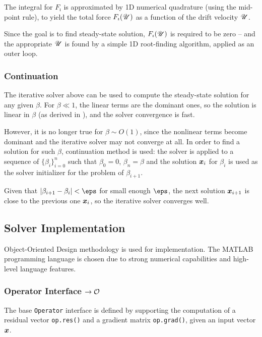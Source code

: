 The integral for $F_\imath$ is approximated by 1D numerical quadrature
(using the mid-point rule), to yield 
the total force $F_\imath(\mathscr{U})$ as a function of the drift velocity $\mathscr{U}$.

Since the goal is to find steady-state solution, $F_\imath(\mathscr{U})$ 
is required to be zero --
and the appropriate $\mathscr{U}$ is found by a simple 1D root-finding algorithm,
applied as an outer loop.

\subsubsection{Continuation}

The iterative solver above can be used to compute the steady-state solution for any given $\beta$.
For $\beta \ll 1$, the linear terms are the dominant ones, so the solution is linear in $\beta$ 
(as derived in \cite{yariv2010migration}), and the solver convergence is fast.

However, it is no longer true for $\beta \sim O(1)$, since the nonlinear terms become dominant
and the iterative solver may not converge at all.
In order to find a solution for such $\beta$, continuation method is used:
the solver is applied to a sequence of $\{\beta_i\}_{i=0}^n$ such that $\beta_0 = 0$,
$\beta_n = \beta$ and the solution $\boldsymbol{x}_i$ for $\beta_i$ is used as the solver initializer
for the problem of $\beta_{i+1}$.

Given that $|\beta_{i+1} - \beta_i| < \eps$ for small enough $\eps$, 
the next solution $\boldsymbol{x}_{i+1}$ is close to the previous one $\boldsymbol{x}_i$,
so the iterative solver converges well.

\subsection{Solver Implementation}

Object-Oriented Design methodology is used for implementation.
The MATLAB programming language is chosen due to strong numerical capabilities
and high-level language features.

\subsubsection{Operator Interface $ \rightarrow \mathcal{O}$}
The base \verb|Operator| interface is defined by 
supporting the computation of a residual vector \verb|op.res()|
and a gradient matrix \verb|op.grad()|, given an input vector $\boldsymbol{x}$.

